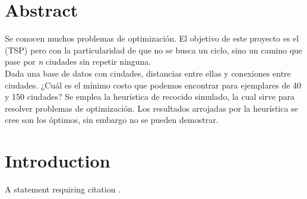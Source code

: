 \documentclass[
10pt,
a4paper,
oneside,
headinclude,footinclude,
BCOR5mm,
]{article}
\begin{document}

\renewcommand{\sectionmark}[1]{\markright{\spacedlowsmallcaps{#1}}} %
\lehead{\mbox{\llap{\small\thepage\kern1em\color{halfgray} \vline}\color{halfgray}\hspace{0.5em}\rightmark\hfil}} %

\pagestyle{scrheadings} %


\setcounter{tocdepth}{2} %

\tableofcontents

\listoffigures

\section*{Abstract}

Se conocen muchos problemas de optimización. El objetivo de este proyecto es el
\TSP (TSP) pero con la particularidad de que no se busca un ciclo, sino un camino
que pase por \textit{n} ciudades sin repetir ninguna.\\
Dada una base de datos con ciudades, distancias entre ellas y conexiones entre
ciudades. ¿Cuál es el mínimo costo que podemos encontrar para ejemplares de 40 y
150 ciudades? Se emplea la heurística de recocido simulado, la cual sirve para
resolver problemas de optimización. Los resultados arrojadas por la heurística se
cree son los óptimos, sin embargo no se pueden demostrar.

\newpage


\section{Introduction}

A statement requiring citation \cite{Figueredo:2009dg}.
\end{document}
